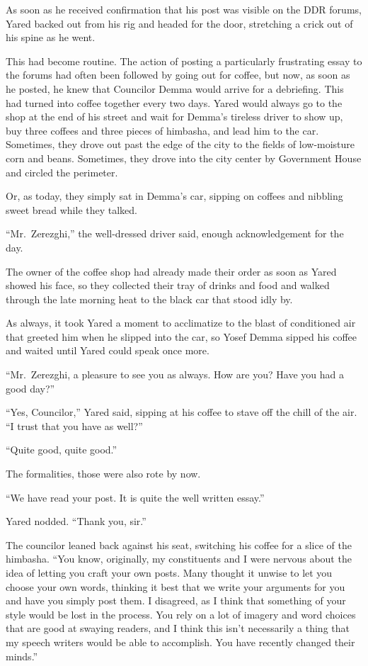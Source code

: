 \noindent As soon as he received confirmation that his post was visible on the DDR forums, Yared backed out from his rig and headed for the door, stretching a crick out of his spine as he went.

This had become routine. The action of posting a particularly frustrating essay to the forums had often been followed by going out for coffee, but now, as soon as he posted, he knew that Councilor Demma would arrive for a debriefing. This had turned into coffee together every two days. Yared would always go to the shop at the end of his street and wait for Demma's tireless driver to show up, buy three coffees and three pieces of himbasha, and lead him to the car. Sometimes, they drove out past the edge of the city to the fields of low-moisture corn and beans. Sometimes, they drove into the city center by Government House and circled the perimeter.

Or, as today, they simply sat in Demma's car, sipping on coffees and nibbling sweet bread while they talked.

``Mr.~Zerezghi,'' the well-dressed driver said, enough acknowledgement for the day.

The owner of the coffee shop had already made their order as soon as Yared showed his face, so they collected their tray of drinks and food and walked through the late morning heat to the black car that stood idly by.

As always, it took Yared a moment to acclimatize to the blast of conditioned air that greeted him when he slipped into the car, so Yosef Demma sipped his coffee and waited until Yared could speak once more.

``Mr.~Zerezghi, a pleasure to see you as always. How are you? Have you had a good day?''

``Yes, Councilor,'' Yared said, sipping at his coffee to stave off the chill of the air. ``I trust that you have as well?''

``Quite good, quite good.''

The formalities, those were also rote by now.

``We have read your post. It is quite the well written essay.''

Yared nodded. ``Thank you, sir.''

The councilor leaned back against his seat, switching his coffee for a slice of the himbasha. ``You know, originally, my constituents and I were nervous about the idea of letting you craft your own posts. Many thought it unwise to let you choose your own words, thinking it best that we write your arguments for you and have you simply post them. I disagreed, as I think that something of your style would be lost in the process. You rely on a lot of imagery and word choices that are good at swaying readers, and I think this isn't necessarily a thing that my speech writers would be able to accomplish. You have recently changed their minds.''

